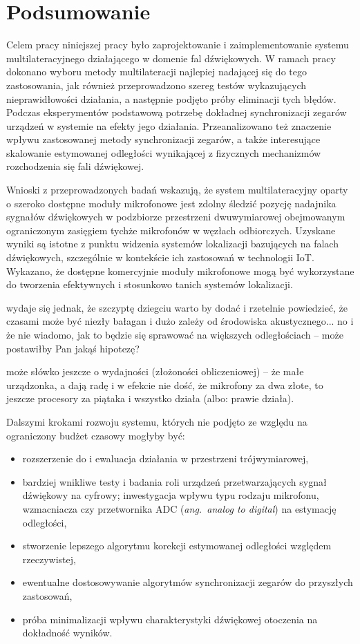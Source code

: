 \chapter*{Podsumowanie}\label{chap:podsumowanie}

Celem pracy niniejszej pracy było zaprojektowanie i zaimplementowanie systemu multilateracyjnego działającego w domenie fal dźwiękowych. W ramach pracy dokonano wyboru metody multilateracji najlepiej nadającej się do tego zastosowania, jak również przeprowadzono szereg testów wykazujących nieprawidłowości działania, a następnie podjęto próby eliminacji tych błędów. Podczas eksperymentów podstawową potrzebę dokładnej synchronizacji zegarów urządzeń w systemie na efekty jego działania. Przeanalizowano też znaczenie wpływu zastosowanej metody synchronizacji zegarów, a także interesujące skalowanie estymowanej odległości wynikającej z fizycznych mechanizmów rozchodzenia się fali dźwiękowej.

Wnioski z przeprowadzonych badań wskazują, że system multilateracyjny oparty o szeroko dostępne moduły mikrofonowe jest zdolny śledzić pozycję nadajnika sygnałów dźwiękowych w podzbiorze przestrzeni dwuwymiarowej obejmowanym ograniczonym zasięgiem tychże mikrofonów w węzłach odbiorczych. Uzyskane wyniki są istotne z punktu widzenia systemów lokalizacji bazujących na falach dźwiękowych, szczególnie w kontekście ich zastosowań w technologii IoT. Wykazano, że dostępne komercyjnie moduły mikrofonowe mogą być wykorzystane do tworzenia efektywnych i stosunkowo tanich systemów lokalizacji.

\color{blue}
wydaje się jednak, że szczyptę dziegciu warto by dodać i rzetelnie powiedzieć, że czasami może być niezły bałagan i dużo zależy od środowiska akustycznego... no i że nie wiadomo, jak to będzie się sprawować na większych odległościach -- może postawiłby Pan jakąś hipotezę?

może słówko jeszcze o wydajności (złożoności obliczeniowej) -- że małe urządzonka, a dają radę i w efekcie nie dość, że mikrofony za dwa złote, to jeszcze procesory za piątaka i wszystko działa (albo: prawie działa).
\color{black}

Dalszymi krokami rozwoju systemu, których nie podjęto ze względu na ograniczony budżet czasowy mogłyby być:

\begin{itemize}
    \item rozszerzenie do i ewaluacja działania w przestrzeni trójwymiarowej,
    \item bardziej wnikliwe testy i badania roli urządzeń przetwarzających sygnał dźwiękowy na cyfrowy; inwestygacja wpływu typu rodzaju mikrofonu, wzmacniacza czy przetwornika ADC (\textit{ang.\ analog to digital}) na estymację odległości,
    \item stworzenie lepszego algorytmu korekcji estymowanej odległości względem rzeczywistej,
    \item ewentualne dostosowywanie algorytmów synchronizacji zegarów do przyszłych zastosowań,
    \item próba minimalizacji wpływu charakterystyki dźwiękowej otoczenia na dokładność wyników.
\end{itemize}

